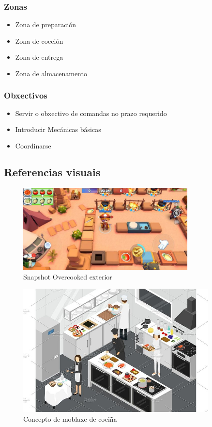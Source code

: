 \documentclass{report}  %
\begin{document}
\subsubsection{Zonas}
\begin{itemize}
    \item Zona de preparación
    \item Zona de cocción
    \item Zona de entrega
    \item Zona de almacenamento
\end{itemize}

\subsubsection{Obxectivos}
\begin{itemize}
    \item Servir o obxectivo de comandas no prazo requerido
    \item Introducir Mecánicas básicas
    \item Coordinarse
\end{itemize}



\newpage
\subsection{Referencias visuais}
\begin{figure}[h]
    \centering
    \includegraphics[width=0.8\textwidth]{images/overcooked_concept.jpg}
    \caption{Snapshot Overcooked exterior}
    \label{fig:Snapshot Overcooked exterior}
\end{figure}

\begin{figure}[h]
    \centering
    \includegraphics[width=0.9\textwidth]{images/kitchen_furniture_concept.jpg}
    \caption{Concepto de moblaxe de cociña}
    \label{fig:Snapshot Overcooked}
\end{figure}
\end{document}
